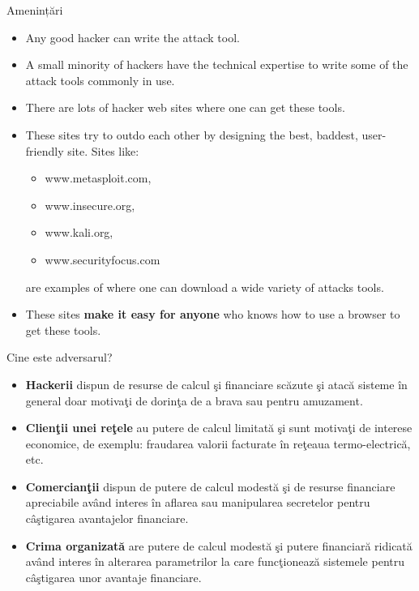 \documentclass[pdf]{beamer}
\begin{document}
\begin{frame}{Amenințări}
\begin{itemize}
\item
Any good hacker can write the attack tool. 

\item
A small minority of hackers have the technical expertise to write some of the attack tools commonly in use.

\item
There are lots of hacker web sites where one can get these tools.

\item
These sites try to outdo each other by designing the best, baddest, user-friendly site. Sites like:
\begin{itemize}
\item
www.metasploit.com,
\item
www.insecure.org, 
\item
www.kali.org, 
\item
www.securityfocus.com 
\end{itemize}
 are examples of where one can download a wide variety of attacks tools. 
\item 
These sites \textbf{make it easy for anyone} who knows how to use a browser to get these tools. 

\end{itemize}
\end{frame}



\begin{frame}{Cine este adversarul?}
\begin{itemize}
\item
\textbf{Hackerii} dispun de resurse de calcul şi financiare scăzute şi atacă sisteme în general doar motivaţi de dorinţa de a brava sau pentru amuzament.

\item
\textbf{Clienţii unei reţele} au putere de calcul limitată şi sunt motivaţi de interese economice, de exemplu: fraudarea valorii facturate în reţeaua termo-electrică, etc.

\item
\textbf{Comercianţii} dispun de putere de calcul modestă şi de resurse financiare apreciabile având interes în aflarea sau manipularea secretelor pentru câştigarea avantajelor financiare.

\item
\textbf{Crima organizată} are putere de calcul modestă şi putere financiară ridicată având interes în alterarea parametrilor la care funcţionează sistemele pentru câştigarea unor avantaje financiare.
\end{itemize}
\end{frame}
\end{document}
